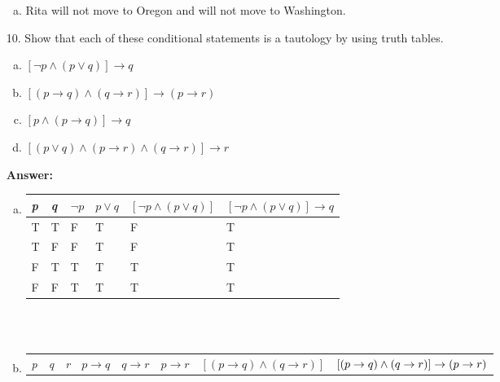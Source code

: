 \begin{itemize}
\begin{enumerate}[a.]
              \item Rita will not move to Oregon and will not move to Washington.
          \end{enumerate}
    \item[10.]Show that each of these conditional statements is a tautology by using truth tables.
          \begin{enumerate}[a.]
              \item $[\neg p \land (p \lor q)] \to q$
              \item $[(p \to q) \land (q \to r)] \to (p \to r)$
              \item $[p \land (p \to q)] \to q$
              \item $[(p \lor q) \land (p \to r) \land (q \to r)] \to r$
          \end{enumerate}
          \textbf{Answer:}
          \begin{enumerate}[a.]
              \item
                    \begin{tabular}{|l|l|l|l|l|l|}
                        \hline
                        \textit{p} & \textit{q} & $\neg p$ & $p \lor q$ & $[\neg p \land (p \lor q)]$ & $[\neg p \land (p \lor q)] \to q$ \\
                        \hline
                        T          & T          & F        & T          & F                           & T                                 \\
                        \hline
                        T          & F          & F        & T          & F                           & T                                 \\
                        \hline
                        F          & T          & T        & T          & T                           & T                                 \\
                        \hline
                        F          & F          & T        & T          & T                           & T                                 \\
                        \hline
                    \end{tabular}
                    \\
                    \\
              \item
                    \begin{tabular}{|l|l|l|l|l|l|l|p{3cm}|}
                        \hline
                        \textit{p} & \textit{q} & \textit{r} & $p \to q$ & $q \to r$ & $p \to r$ & $[(p \to q) \land (q \to r)]$ & $[(p \to q) \land (q \to r)] \newline \to (p \to r)$ \\

\end{tabular}
\end{enumerate}
\end{itemize}
